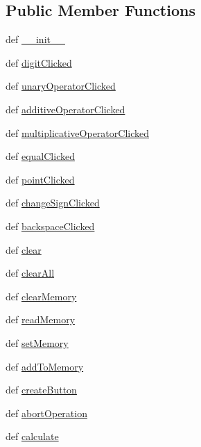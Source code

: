 \subsection*{Public Member Functions}
\begin{DoxyCompactItemize}
\item 
def \hyperlink{classcalculator_1_1Calculator_ad7346c8939f7ab7699bb430705be2aff}{\+\_\+\+\_\+init\+\_\+\+\_\+}
\item 
def \hyperlink{classcalculator_1_1Calculator_aa5f0aa6e90be8de14674afc6877b0dcf}{digit\+Clicked}
\item 
def \hyperlink{classcalculator_1_1Calculator_a88f8c54fc9d93febd893d60af55c6d3a}{unary\+Operator\+Clicked}
\item 
def \hyperlink{classcalculator_1_1Calculator_a23accec35f345fee969aa536317728dc}{additive\+Operator\+Clicked}
\item 
def \hyperlink{classcalculator_1_1Calculator_a6744292b414a482f88a00475d82f3003}{multiplicative\+Operator\+Clicked}
\item 
def \hyperlink{classcalculator_1_1Calculator_afb38ab89ade895adabccdb44df2a1a07}{equal\+Clicked}
\item 
def \hyperlink{classcalculator_1_1Calculator_a7a9351cccc4c76b7bc922ae60aee6ab0}{point\+Clicked}
\item 
def \hyperlink{classcalculator_1_1Calculator_a516b2183ea399ad265277f4de0050af7}{change\+Sign\+Clicked}
\item 
def \hyperlink{classcalculator_1_1Calculator_a534c59587ccdeb613a8bc2cff2b89d34}{backspace\+Clicked}
\item 
def \hyperlink{classcalculator_1_1Calculator_aa363caa584a47de076f28b5cdfb23fd0}{clear}
\item 
def \hyperlink{classcalculator_1_1Calculator_af0c4d5ff6649e098eb629c29cb04da20}{clear\+All}
\item 
def \hyperlink{classcalculator_1_1Calculator_a39deb064394cfa43cdf6ce0ccaf877ab}{clear\+Memory}
\item 
def \hyperlink{classcalculator_1_1Calculator_afd1c3e2d6dee62ef9ec0e26e0dbb50c5}{read\+Memory}
\item 
def \hyperlink{classcalculator_1_1Calculator_a1c1b5c76967377d221cfc1bbb8ca0c80}{set\+Memory}
\item 
def \hyperlink{classcalculator_1_1Calculator_a98c034aa5173a7de966d719f76b5226f}{add\+To\+Memory}
\item 
def \hyperlink{classcalculator_1_1Calculator_acb16d047f1def8c065c5f6441c6b59e9}{create\+Button}
\item 
def \hyperlink{classcalculator_1_1Calculator_a843735182e5c05a8c17f1b3e5878549f}{abort\+Operation}
\item 
def \hyperlink{classcalculator_1_1Calculator_a349ebac5ede047c224edb1f24e40cb60}{calculate}
\end{DoxyCompactItemize}
